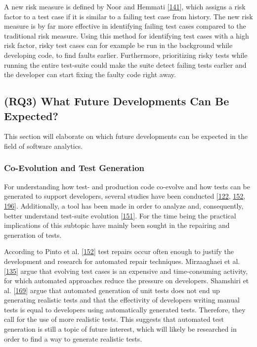 \documentclass[]{book}
\begin{document}
A new risk measure is defined by Noor and Hemmati
{[}\protect\hyperlink{ref-noor2015test}{141}{]}, which assigns a risk
factor to a test case if it is similar to a failing test case from
history. The new risk measure is by far more effective in identifying
failing test cases compared to the traditional risk measure. Using this
method for identifying test cases with a high risk factor, risky test
cases can for example be run in the background while developing code, to
find faults earlier. Furthermore, prioritizing risky tests while running
the entire test-suite could make the suite detect failing tests earlier
and the developer can start fixing the faulty code right away.

\subsection{(RQ3) What Future Developments Can Be
Expected?}\label{rq3-what-future-developments-can-be-expected}

This section will elaborate on which future developments can be expected
in the field of software analytics.

\subsubsection{Co-Evolution and Test
Generation}\label{co-evolution-and-test-generation}

For understanding how test- and production code co-evolve and how tests
can be generated to support developers, several studies have been
conducted {[}\protect\hyperlink{ref-marsavina2014}{122},
\protect\hyperlink{ref-pinto2012understanding}{152},
\protect\hyperlink{ref-zaidman2011studying}{196}{]}. Additionally, a
tool has been made in order to analyze and, consequently, better
understand test-suite evolution
{[}\protect\hyperlink{ref-pinto2013}{151}{]}. For the time being the
practical implications of this subtopic have mainly been sought in the
repairing and generation of tests.

According to Pinto et al.
{[}\protect\hyperlink{ref-pinto2012understanding}{152}{]} test repairs
occur often enough to justify the development and research for automated
repair techniques. Mirzaaghaei et al.
{[}\protect\hyperlink{ref-supportingtestsuite}{135}{]} argue that
evolving test cases is an expensive and time-consuming activity, for
which automated approaches reduce the pressure on developers. Shamshiri
et al. {[}\protect\hyperlink{ref-shamshiri2018automatically}{169}{]}
argue that automated generation of unit tests does not end up generating
realistic tests and that the effectivity of developers writing manual
tests is equal to developers using automatically generated tests.
Therefore, they call for the use of more realistic tests. This suggests
that automated test generation is still a topic of future interest,
which will likely be researched in order to find a way to generate
realistic tests.
\end{document}
